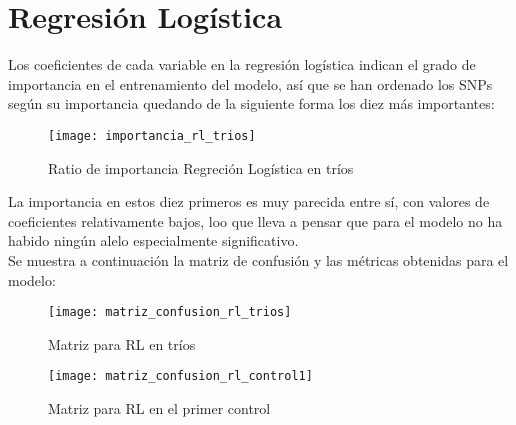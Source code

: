 \section{Regresión Logística}
Los coeficientes de cada variable en la regresión logística indican el grado de importancia en el entrenamiento del modelo, así que se han ordenado los SNPs según su importancia quedando de la siguiente forma los diez más importantes:

\begin{figure}[H]
  \centering
  \texttt{[image: importancia\_rl\_trios]}
  \caption{Ratio de importancia Regreción Logística en tríos}
  \label{fig:k-nn-example}
\end{figure}

La importancia en estos diez primeros es muy parecida entre sí, con valores de coeficientes relativamente bajos, loo que lleva a pensar que para el modelo no ha habido ningún alelo especialmente significativo.\\
Se muestra a continuación la matriz de confusión y las métricas obtenidas para el modelo:

\begin{figure}[H]
\centering
\begin{minipage}[t]{.5\textwidth}
  \texttt{[image: matriz\_confusion\_rl\_trios]}
  \caption{Matriz para RL en tríos}
  \label{fig:k-nn-example}
\end{minipage}%
\hfill
\begin{minipage}[t]{.5\textwidth}
  \texttt{[image: matriz\_confusion\_rl\_control1]}
  \caption{Matriz para RL en el primer control}
  \label{fig:confusion-knn-control1}
\end{minipage}
\end{figure}

